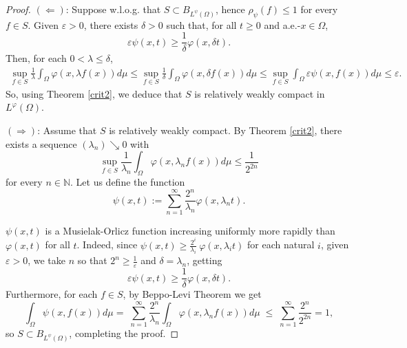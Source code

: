 \documentclass[10pt,a4paper]{amsart}
\newcommand{\lphi}{{L^{\varphi}(\Omega)}}
\begin{document}
\begin{proof}
$(\Leftarrow)$: Suppose w.l.o.g. that $S\subset B_{L^{\psi}(\Omega)}$, hence $\rho_{\psi}(f)\leq 1$ for every $f\in S$. %
Given $\varepsilon>0$, there exists $\delta>0$ such that, for all $t\geq 0$ and a.e.-$x\in\Omega$,
$$
\varepsilon\psi(x,t) \geq  \frac{1}{\delta}\varphi(x,\delta t).
$$
Then, for each $0<\lambda\leq \delta$,
\begin{align*}
\sup_{f\in S} \frac{1}{\lambda}\int_{\Omega} \varphi(x,\lambda f(x))d\mu
\leq \sup_{f\in S} \frac{1}{\delta}\int_{\Omega} \varphi(x,\delta f(x)) d\mu
\leq \sup_{f\in S}\int_{\Omega} \varepsilon\psi(x,f(x))d\mu
\leq{} \varepsilon.
\end{align*}
So, using Theorem \ref{crit2}, we deduce that $S$ is relatively weakly compact in $\lphi$.

$(\Rightarrow)$:
Assume that $S$ is relatively weakly compact. By Theorem \ref{crit2}, there exists a sequence $(\lambda_n)\searrow 0$ with
\begin{equation}\label{}
\sup_{f\in S}\frac{1}{\lambda_n}\int_{\Omega} \varphi(x, \lambda_n f(x)) d\mu \leq  \frac{1}{2^{2n}}
\end{equation}
for every $n\in\mathbb{N}$. Let us define the function
$$
\psi(x,t):=\sum_{n=1}^{\infty} \frac{2^n}{\lambda_n}\varphi(x, \lambda_n t).
$$

$\psi(x,t)$ is a Musielak-Orlicz function increasing uniformly more rapidly than $\varphi(x,t)$ for all $t$. Indeed, since $\psi(x,t)\geq \frac{2^i}{\lambda_i}\ \varphi(x,\lambda_i t)$ for each natural $i$, given $\varepsilon>0$, we take $n$ so that  $2^n\geq \frac{1}{\varepsilon}$ and $\delta=\lambda_n$, getting
$$\varepsilon\psi(x,t)\geq \frac{1}{\delta} \varphi(x,\delta t).$$
Furthermore, for each $f\in S$, by Beppo-Levi Theorem we get
$$
\int_{\Omega} \psi(x,f(x))d\mu
=\;  \sum_{n=1}^{\infty}\frac{2^n}{\lambda_n}\int_{\Omega} \varphi(x, \lambda_n f(x)) d\mu \;
\leq\;  \sum_{n=1}^{\infty} \frac{2^n}{2^{2n}}
= 1,
$$
so $S\subset B_{L^{\psi}(\Omega)}$, completing the proof.

\end{proof}
\end{document}
